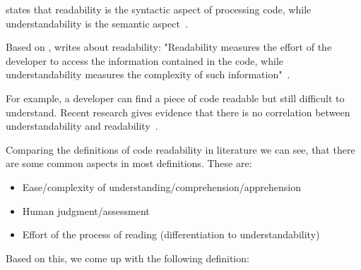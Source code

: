 \documentclass[%
class=scrreprt,
chapterprefix=false,%
open=right,%
twoside=false,%
paper=a4,%
logofile={Logo\_zentral\_farbig\_EN.png},%
thesistype=master,%
UKenglish,%
]{se2thesis}
\theoremstyle{definition}
\newtheorem{definition}{Definition}[section]
\begin{document}
	\citeauthor{posnett2011simpler} states that readability is the syntactic aspect of processing code, while understandability is the semantic aspect~\cite{posnett2011simpler}.
	
	Based on \citeauthor{posnett2011simpler}, \citeauthor{scalabrino2018comprehensive} writes about readability: "Readability measures the effort of the developer to access the information contained in the code, while understandability measures the complexity of such information"~\cite{scalabrino2018comprehensive, posnett2011simpler}.
	
	
	For example, a developer can find a piece of code readable but still difficult to understand. Recent research gives evidence that there is no correlation between understandability and readability~\cite{scalabrino2017automatically}.	
	
	
		

	Comparing the definitions of code readability in literature we can see, that there are some common aspects in most definitions. These are:
	\begin{itemize}
		\item Ease/complexity of understanding/comprehension/apprehension
		\item Human judgment/assessment
		\item Effort of the process of reading (differentiation to understandability)
	\end{itemize}
	Based on this, we come up with the following definition: 
\end{document}
